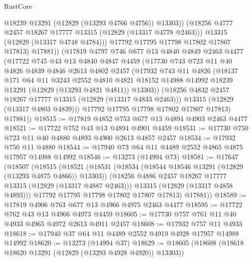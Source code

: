 \begin{lexlean}{RustCore}
\begin{coremodule}
                  @18239
                  @13291
                  (@12829 (@13293 @4766 @4756))
                  @13303))
              (@18256 @4777 @2457 @18267 @17777 @13315 (@12829 (@13317 @4778 @2463)))
              @13315
              (@12829 (@13317 @4748 @4784)))
            @17792
            @17795
            @17798
            @17802
            @17807
            @17813)
          @17881))
      (@17819
        @4797
        @746
        @677
        @13
        @4840
        @4849
        @2463
        @4477
        (@17722
          @745
          @43
          @13
          @4840
          @4847
          @4459
          (@17730
            @743
            @723
            @11
            @40
            @4826
            @4839
            @4846
            @2613
            @4802
            @2457
            (@17932
              @743
              @11
              @4826
              (@18137
                @171
                @64
                @11
                @3243
                @2552
                @4810
                @4821
                @18152
                @14988
                @14992
                @18239
                @13291
                (@12829 (@13293 @4821 @4811))
                @13303))
            (@18256 @4832 @2457 @18267 @17777 @13315 (@12829 (@13317 @4833 @2463)))
            @13315
            (@12829 (@13317 @4803 @4839)))
          @17792
          @17795
          @17798
          @17802
          @17807
          @17813)
        @17881))
@18515 := @17819 @4852 @753 @677 @13 @4894 @4903 @2463 @4477
@18521 := @17722 @752 @43 @13 @4894 @4901 @4459
@18531 := @17730 @750 @723 @11 @40 @4880 @4893 @4900 @2613 @4857 @2457
@18534 := @17932 @750 @11 @4880
@18544 := @17940 @73 @64 @11 @4489 @2552 @4865 @4875 @17957 @14988 @14992
@18546 := @13273 (@14994 @73)
@18581 := @17647
    (@18507
      (@18515
        (@18521
          (@18531
            (@18534 (@18544 @18546 @13291 (@12829 (@13293 @4875 @4866)) @13303))
            (@18256 @4886 @2457 @18267 @17777 @13315 (@12829 (@13317 @4887 @2463)))
            @13315
            (@12829 (@13317 @4858 @4893)))
          @17792
          @17795
          @17798
          @17802
          @17807
          @17813)
        @17881))
@18589 := @17819 @4906 @763 @677 @13 @4966 @4975 @2463 @4477
@18595 := @17722 @762 @43 @13 @4966 @4973 @4459
@18605 := @17730 @757 @761 @11 @40 @4933 @4965 @4972 @2613 @4911 @2457
@18608 := @17932 @757 @11 @4933
@18618 := @17940 @37 @64 @11 @4489 @2552 @4919 @4928 @17957 @14988 @14992
@18620 := @13273 (@14994 @37)
@18629 := @18605 (@18608 (@18618 @18620 @13291 (@12829 (@13293 @4928 @4920)) @13303))

\end{coremodule}
\end{lexlean}
